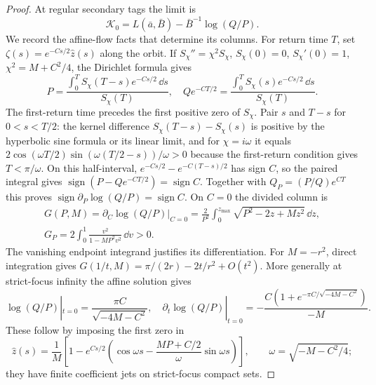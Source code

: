 \begin{proof}
At regular secondary tags the limit is
\begin{equation}\label{rw:secondary:regular-limit}
 \mathcal K_0=L(\bar a,\bar B)-\bar B^{-1}\log(Q/P).
\end{equation}
We record the affine-flow facts that determine its columns.
For return time $T$, set $\zeta(s)=e^{-Cs/2}\hat z(s)$ along the
orbit.
If $S_\chi''=\chi^2S_\chi$, $S_\chi(0)=0$, $S_\chi'(0)=1$,
$\chi^2=M+C^2/4$, the Dirichlet formula gives
\[
 P=\frac{\int_0^TS_\chi(T-s)e^{-Cs/2}\,\dd s}{S_\chi(T)},\quad
 Qe^{-CT/2}=\frac{\int_0^TS_\chi(s)e^{-Cs/2}\,\dd s}{S_\chi(T)}.
\]
The first-return time precedes the first positive zero of $S_\chi$.
Pair $s$ and $T-s$ for $0<s<T/2$: the kernel difference
$S_\chi(T-s)-S_\chi(s)$ is positive by the hyperbolic sine formula
or its linear limit, and for $\chi=i\omega$ it equals
$2\cos(\omega T/2)\sin(\omega(T/2-s))/\omega>0$
because the first-return condition gives $T<\pi/\omega$.
On this half-interval, $e^{-Cs/2}-e^{-C(T-s)/2}$ has sign $C$,
so the paired integral gives
$\operatorname{sign}(P-Qe^{-CT/2})=\operatorname{sign}C$.
Together with $Q_P=(P/Q)e^{CT}$ this proves
$\operatorname{sign}\partial_P\log(Q/P)=\operatorname{sign}C$.
On $C=0$ the divided column is
\[
\begin{gathered}
 G(P,M)=\partial_C\log(Q/P)|_{C=0}
   =\frac2{P^2}\int_0^{z_{\max}}
                         \sqrt{P^2-2z+Mz^2}\,\dd z,\\
 G_P=2\int_0^1\frac{v^2}{1-MP^2v^2}\,\dd v>0.
\end{gathered}
\]
The vanishing endpoint integrand justifies its differentiation.
For $M=-r^2$, direct integration gives
$G(1/t,M)=\pi/(2r)-2t/r^2+O(t^2)$.
More generally at strict-focus infinity the affine solution gives
\[
 \log(Q/P)|_{t=0}=\frac{\pi C}{\sqrt{-4M-C^2}},\quad
 \partial_t\log(Q/P)|_{t=0}
 =-\frac{C(1+e^{-\pi C/\sqrt{-4M-C^2}})}{-M}.
\]
These follow by imposing the first zero in
\[
 \hat z(s)=\frac1M\left[
 1-e^{Cs/2}\left(\cos\omega s-
       \frac{MP+C/2}{\omega}\sin\omega s\right)\right],
 \qquad \omega=\sqrt{-M-C^2/4};
\]
they have finite coefficient jets on strict-focus compact sets.


\end{proof}
